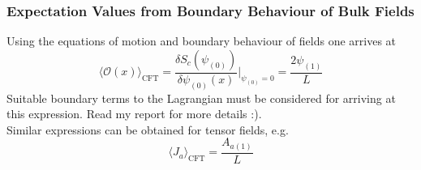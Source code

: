 \documentclass{beamer}
\begin{document}
\begin{frame}
\frametitle{Expectation Values from Boundary Behaviour of Bulk Fields}
Using the equations of motion and boundary behaviour of fields one arrives at
\begin{equation}
\langle \mathcal{O}(x) \rangle_{\mathrm{CFT}}=\frac{\delta S_c(\psi_{(0)})}{\delta\psi_{(0)}(x)}|_{\psi_{(0)}=0}
=\frac{2\psi_{(1)}}{L}
\end{equation}
Suitable boundary terms to the Lagrangian must be considered for arriving at this expression. Read my report for more details :).\\
Similar expressions can be obtained for tensor fields, e.g.\\
 \begin{equation}
 \langle J_a\rangle_{\mathrm{CFT}}=\frac{A_{a(1)}}{L}
\end{equation}
\end{frame}
\end{document}
